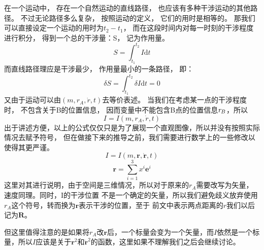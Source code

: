 \documentclass[UTF8,12pt]{ctexart}
\begin{document}
            在一个运动中，
            存在一个自然运动的直线路径，
            也应该有多种干涉运动的其他路径。
            不过无论路径多么复杂，
            按照运动的定义，
            它们的用时是相等的。
            那我们可以直接设定一个运动的用时为$t_2-t_1$，
            而在这段时间内对每一时刻的干涉程度进行积分，
            得到一个总的干涉量：S，
            记为作用量。
            \begin{equation}
                S=\int_{t_1}^{t_2}I\mathrm{d}t 
            \end{equation}
            而直线路径理应是干涉最少，
            作用量最小的一条路径，
            即：
            \begin{equation} 
                \delta S=\int_{t_1}^{t_2}\delta I\mathrm{d}t=0
            \end{equation}
            又由于运动可以由$(m,r_A,\dot{r},t)$去等价表述。
            当我们在考虑某一点的干涉程度时，
            不包含关于B的位置信息，
            因而变量中不能包含B点的位置信息$\emph{r}_B$，所以
            \begin{equation}I=I(m,r_A,\dot{r},t)\end{equation}
            出于讲述方便，以上的公式仅仅只是为了展现一个直观图像，所以并没有按照实际情况去赋予符号，
            但在做接下来的推导之前，我们需要进行数学上的一些修改以使得其更严谨。
            \begin{equation}I=I(m,\textbf{r},\dot{\textbf{r}},t)\end{equation}
            \begin{equation} \textbf{r}=\sum_{i = 1}^{3}x^i\textbf{e}^i  \end{equation}
            这里对其进行说明，由于空间是三维情况，所以对于原来的$r_A$需要改写为矢量，速度同理。同时，I的干涉位置
            不是一个确定的矢量，所以我们避免歧义放弃使用$r_A$这个符号，转而换为$\textbf{r}$表示干涉的位置，至于
            前文中表示两点距离的$r$我们以后记为$\textbf{R}$。

            但这里值得注意的是如果将$r_A$改$\textbf{r}$后，一个标量会变为一个矢量，而$I$依然是一个标量，所以$I$应该是关于$\textbf{r}^2$和$\dot{\textbf{r}}^2$的函数，这里如果不理解我们之后会继续讨论。
            
\end{document}
